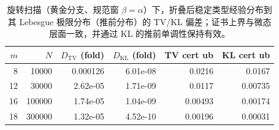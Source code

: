 \begin{table}[H]
\centering
\small
\begin{tabular}{rrrrrr}
\toprule
$m$ & $N$ & $D_{\mathrm{TV}}$ (fold) & $D_{\mathrm{KL}}$ (fold) & TV cert ub & KL cert ub\\
\midrule
8 & 10000 & 0.000126 & 6.01e-08 & 0.0216 & 0.0167\\
12 & 30000 & 2.62e-05 & 1.71e-09 & 0.0117 & 0.00735\\
16 & 100000 & 1.74e-05 & 1.04e-09 & 0.00493 & 0.00174\\
18 & 300000 & 1.32e-05 & 4.52e-10 & 0.00196 & 0.00031\\
\bottomrule
\end{tabular}
\caption{旋转扫描（黄金分支、规范窗 $\beta=\alpha$）下，折叠后稳定类型经验分布到其 Lebesgue 极限分布（推前分布）的 TV/KL 偏差；证书上界与微态层面一致，并通过 KL 的推前单调性保持有效。}
\label{tab:rotation-folded-kl-certificate}
\end{table}
